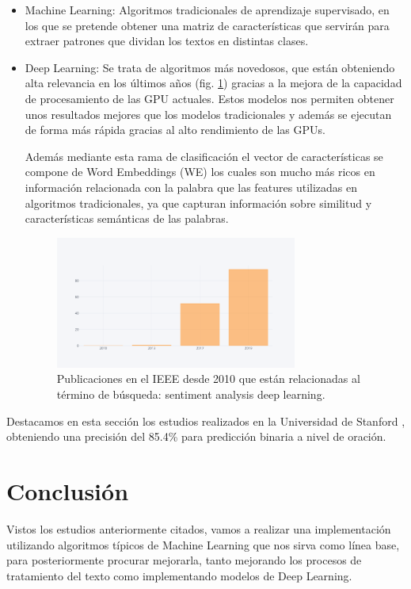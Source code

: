 \begin{itemize}
	\item Machine Learning: Algoritmos tradicionales de aprendizaje supervisado, en los que se pretende obtener una matriz de características que servirán para extraer patrones que dividan los textos en distintas clases.
	\item Deep Learning: Se trata de algoritmos más novedosos, que están obteniendo alta relevancia en los últimos años (fig. \ref{pdeep}) gracias a la mejora de la capacidad de procesamiento de las GPU actuales. Estos modelos nos permiten obtener unos resultados mejores que los modelos tradicionales y además se ejecutan de forma más rápida gracias al alto rendimiento de las GPUs. 
	
	Además mediante esta rama de clasificación el vector de características se compone de Word Embeddings (WE) los cuales son mucho más ricos en información relacionada con la palabra que las features utilizadas en algoritmos tradicionales, ya que capturan información sobre similitud y características semánticas de las palabras.
	
	\begin{figure}[!ht]
		\centering
		\includegraphics[width=0.75\textwidth]{imaxes/pubsDeep.png}
		\caption{Publicaciones en el IEEE desde 2010 que están relacionadas al término de búsqueda: sentiment analysis deep learning.}
				\label{pdeep}
	\end{figure}
\end{itemize}
Destacamos en esta sección los estudios realizados en la Universidad de Stanford \cite{Stanford}, obteniendo una precisión del 85.4\% para predicción binaria a nivel de oración.

\section {Conclusión}

Vistos los estudios anteriormente citados, vamos a realizar una implementación utilizando algoritmos típicos de Machine Learning que nos sirva como línea base, para posteriormente procurar mejorarla, tanto mejorando los procesos de tratamiento del texto como implementando modelos de Deep Learning.